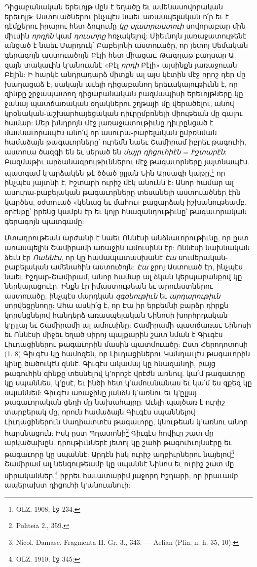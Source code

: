 \documentclass{article}
\begin{document}
{Դիցաբանական երեւոյթ մըն է եղածը եւ ամենասովորական երեւոյթ: Աստուածներու ինչպէս նաեւ առասպելական ո՛ր եւ է դէմքերու իրարու հետ ձուլումը \emph{կը սլատրաստուի} սովորաբար մին միւսին \emph{որդին} կամ \emph{դուստրը} հռչակելով: Միեւնոյն յառաջատութենէ անցած է նաեւ Մարդուկ՝ Բաբելոնի աստուածը, որ յետոյ Սեմական գերագոյն աստուածոյն Բէլի հետ միացաւ. Թագղաթ-բաղսար Ա. զայն տակաւին կ'անուանէ «Բէլ \emph{որդի} Բէլի» այսինքն յառաջուան Բէլին: Ի հարկէ անդրադարձ միտքն ալ այս կէտին մէջ որոշ դեր մը խաղացաձ է, սակայն աւելի դիցաբանող երեւակայութիւնն է, որ զինքը շրջապատող դիցաբանական բազմապիսի երեւոյթները կը ջանայ պատճառական օղակներու շղթայի մը վերածելու, անով կրօնական-աշխարհայեցական դիւրըմբռնելի միութեան մը գալու համար: Մեր խնդրոյն մէջ յառաջատութիւնը դիւրընցած է մասնաւորապէս անո՛վ որ ասուրա-բաբելական ըմբռնման համաձայն թագաւորները՝ ուրեմն նաեւ Շամիրամ իբրեւ թագուհի, աստուա ծազգի են եւ սերած են \emph{մայր դիցուհիէն} = \emph{Իշտարէն}: Բազմաթիւ արձանագրութիւններու մէջ թագաւորները յայտնապէս. պատգամ կ'արձակեն թէ ծծած ըլլան Նին Արսագի կաթը,\footnote{OLZ. 1908, էջ 234.} որ ինչպէս յայտնի է, Իշտարի ուրիշ մէկ անունն է: Անոր համար ալ ասուրա-բաբելական թագաւորները տեսանելի աստուածներ էին կարծես, օժտուած «կենաց եւ մահու» բացարձակ իշխանութեամբ. օրէնքը՝ իրենց կամքն էր եւ կոյր հնազանդութիւնը՝ թագաւորական գերագոյն պատգամը:

Մտադրութեան արժանի է նաեւ Ոննէսի անձնաւորութիւնը, որ ըստ առասպելին Շամիրամի առաջին ամուսինն էր: Ոննէսի նախնական ձեւն էր \emph{Ոաննէս}, որ կը համապատասխանէ \emph{Էա} սումերական-բաբելական ամենահին աստուծոյն: \emph{Էա} ջրոյ Աստուած էր, ինչպէս նաեւ Իշդար-Շամիրամ, անոր համար ալ ձկան կերպարանքով կը ներկայացուէր: Ինքն էր իմաստութեան եւ արուեստներու աստուածը, ինչպէս մարդկան \emph{զգօնութիւն} եւ \emph{արդարութիւն} սորվեցընողը: Ահա ասկի՛ց է, որ Էա իր երբեմնի բարձր դիրքն կորսնցնելով հանդերձ առասպելական Նինոսի խորհրդական կ'ըլլայ եւ Շամիրամի ալ ամուսինը: Շամիրամի պատճառաւ Նինոսի եւ Ոննէսի միջեւ եղած սիրոյ պայքարին շատ նման է Գիւգէս Լիւդացիներու թագաւորին մասին պատմուածը: Ըստ Հերոդոտոսի (1. 8) Գիւգէս կը համոզեն, որ Լիւդացիներու Կանդաւլէս թագաւորին կինը ծածուկէն զննէ. Գիւգէս ակամայ կը հնազանդի, բայց թագուհին զինքը տեսնելով կ'որոշէ վրէժն առնուլ. կա՛մ թագաւորը կը սպաննես, կ'ըսէ, եւ ինծի հետ կ'ամուսնանաս եւ կա՛մ ես զքեզ կը սպաննեմ: Գիւգէս առաջինը յանձն կ'առնու եւ կ'ըլլայ թագաւորական ցեղի մը նախահայրը: Աւելի պայծառ է ուրիշ տարբերակ մը, որուն համաձայն Գիւգէս սպաննելով Լիւդացիներուն Սադիատտէս թագաւորը, կնութեան կ'առնու անոր հարսնացուն: Իսկ ըստ Պղատոնի\footnote{Politeia 2., 359.} Գիւգէս հովիւը շատ մը արկածախըն. դրութիւններէ յետոյ կը շահի թագուհւոյնսէրը եւ թագաւորը կը սպաննէ: Արդէն իսկ ուրիշ աղբիւրներու նայելով\footnote{Nicol. Damasc. Fragmenta H. Gr. 3., 343. — Aelian (Plin. n. h. 35, 10):} Շամիրամ ալ նենգութեամբ կը սպաննէ Նինոս եւ ուրիշ շատ մը սիրականներ,\footnote{OLZ. 1910, էջ 345:} իբրեւ հաւատարիմ յաջորդ Իշդարի, որ իրաւամբ ապերախտ դիցուհի կ'անուանուի:

}
\end{document}

